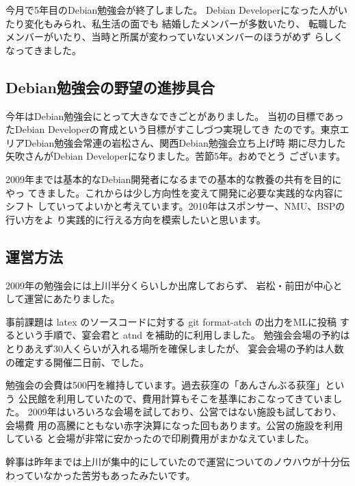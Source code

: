 \documentclass[mingoth,a4paper]{jsarticle}
\begin{document}
\label{sec:debmtg2009results}

今月で5年目のDebian勉強会が終了しました。
Debian Developerになった人がいたり変化もみられ、私生活の面でも
結婚したメンバーが多数いたり、
転職したメンバーがいたり、当時と所属が変わっていないメンバーのほうがめず
らしくなってきました。

\subsection{Debian勉強会の野望の進捗具合}

今年はDebian勉強会にとって大きなできごとがありました。
当初の目標であったDebian Developerの育成という目標がすこしづつ実現してき
たのです。東京エリアDebian勉強会常連の岩松さん、関西Debian勉強会立ち上げ時
期に尽力した矢吹さんがDebian Developerになりました。苦節5年。おめでとう
ございます。

2009年までは基本的なDebian開発者になるまでの基本的な教養の共有を目的にやっ
てきました。これからは少し方向性を変えて開発に必要な実践的な内容にシフト
していってよいかと考えています。2010年はスポンサー、NMU、BSPの行い方をよ
り実践的に行える方向を模索したいと思います。

\subsection{運営方法}

2009年の勉強会には上川半分くらいしか出席しておらず、
岩松・前田が中心として運営にあたりました。

事前課題は latex のソースコードに対する git format-atch の出力をMLに投稿
するという手順で、宴会君と atnd を補助的に利用しました。
勉強会会場の予約はとりあえず30人くらいが入れる場所を確保しましたが、
宴会会場の予約は人数の確定する開催二日前、でした。

勉強会の会費は500円を維持しています。過去荻窪の「あんさんぶる荻窪」という
公民館を利用していたので、費用計算もそこを基準におこなってきていました。
2009年はいろいろな会場を試しており、公営ではない施設も試しており、会場費
用の高騰にともない赤字決算になった回もあります。公営の施設を利用している
と会場が非常に安かったので印刷費用がまかなえていました。

幹事は昨年までは上川が集中的にしていたので運営についてのノウハウが十分伝
わっていなかった苦労もあったみたいです。
\end{document}
